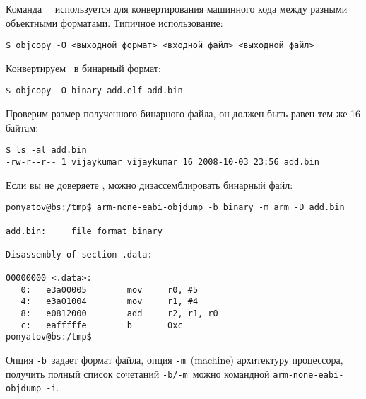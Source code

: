 Команда \gnut\ \ используется для конвертирования машинного кода
между разными объектными форматами. Типичное использование:

\begin{verbatim}
$ objcopy -O <выходной_формат> <входной_файл> <выходной_файл>
\end{verbatim}

Конвертируем \ в бинарный формат:

\begin{verbatim}
$ objcopy -O binary add.elf add.bin
\end{verbatim}

Проверим размер полученного бинарного файла, он должен быть равен тем же 16
байтам:

\begin{verbatim}
$ ls -al add.bin
-rw-r--r-- 1 vijaykumar vijaykumar 16 2008-10-03 23:56 add.bin
\end{verbatim}

Если вы не доверяете , можно дизассемблировать бинарный файл:

\begin{verbatim}
ponyatov@bs:/tmp$ arm-none-eabi-objdump -b binary -m arm -D add.bin

add.bin:     file format binary

Disassembly of section .data:

00000000 <.data>:
   0:   e3a00005        mov     r0, #5
   4:   e3a01004        mov     r1, #4
   8:   e0812000        add     r2, r1, r0
   c:   eafffffe        b       0xc
ponyatov@bs:/tmp$ 
\end{verbatim}
Опция \verb|-b|\ задает формат файла, опция \verb|-m|\ (machine) архитектуру
процессора, получить полный список сочетаний \verb|-b/-m|\ можно командной
\verb|arm-none-eabi-objdump -i|.

\secup
{}\secdown
{}
\secup
{}
\secdown
{}
\secup
{}\secdown
{}
\secup
{}\secdown
{}
\secup
{}
\secdown
{}
\secup
{}
\secdown
{}
\secup
{}
\label{kumarB}
 
\secup 